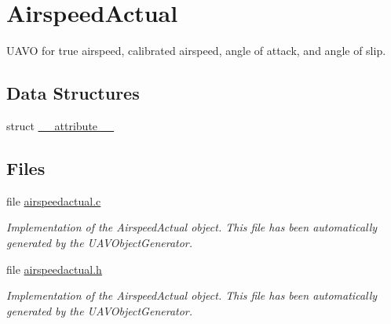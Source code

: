 \hypertarget{group___airspeed_actual}{\section{\-Airspeed\-Actual}
\label{group___airspeed_actual}
}


\-U\-A\-V\-O for true airspeed, calibrated airspeed, angle of attack, and angle of slip.  


\subsection*{\-Data \-Structures}
\begin{DoxyCompactItemize}
\item 
struct \hyperlink{struct____attribute____}{\-\_\-\-\_\-attribute\-\_\-\-\_\-}
\end{DoxyCompactItemize}
\subsection*{\-Files}
\begin{DoxyCompactItemize}
\item 
file \hyperlink{airspeedactual_8c}{airspeedactual.\-c}
\begin{DoxyCompactList}\small\item\em \-Implementation of the \-Airspeed\-Actual object. \-This file has been automatically generated by the \-U\-A\-V\-Object\-Generator. \end{DoxyCompactList}\item 
file \hyperlink{airspeedactual_8h}{airspeedactual.\-h}
\begin{DoxyCompactList}\small\item\em \-Implementation of the \-Airspeed\-Actual object. \-This file has been automatically generated by the \-U\-A\-V\-Object\-Generator. \end{DoxyCompactList}\end{DoxyCompactItemize}
